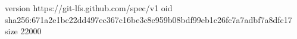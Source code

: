 version https://git-lfs.github.com/spec/v1
oid sha256:671a2e1bc22dd497ec367c16be3c8e959b08bdf99eb1c26fc7a7adbf7a8dfc17
size 22000
